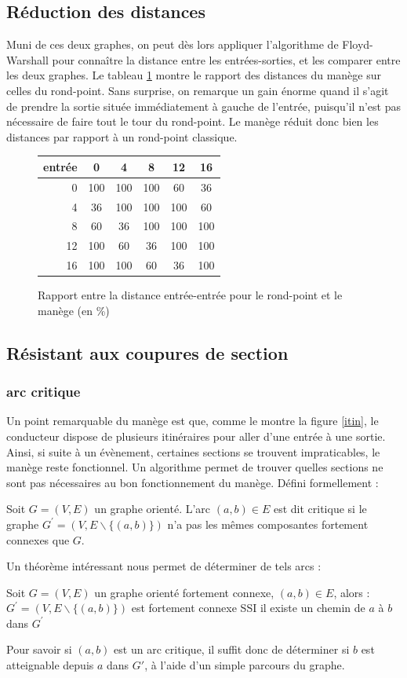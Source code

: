 \documentclass[11pt]{article}
\begin{document}
	\subsection{Réduction des distances}
Muni de ces deux graphes, on peut dès lors appliquer l'algorithme de Floyd-Warshall pour connaître la distance entre les entrées-sorties, et les comparer entre les deux graphes. Le tableau \ref{rpfw} montre le rapport des distances du manège sur celles du rond-point. Sans surprise, on remarque un gain énorme quand il s'agit de prendre la sortie située immédiatement à gauche de l'entrée, puisqu'il n'est pas nécessaire de faire tout le tour du rond-point. Le manège réduit donc bien les distances par rapport à un rond-point classique.

\begin{figure}
	\caption{\label{rpfw} Rapport entre la distance entrée-entrée pour le rond-point et le manège (en \%)}
	\begin{center}
	\begin{tabular}{ r|c c c c c}
  entrée & 0 & 4 & 8 & 12 & 16 \\ \hline
  0 & 100 & 100 & 100 & 60 & 36 \\
4 & 36 & 100 & 100 & 100 & 60 \\
8 & 60 & 36 & 100 & 100 & 100 \\
12 & 100 & 60 & 36 & 100 & 100 \\
16 & 100 & 100 & 60 & 36 & 100 \\
	\end{tabular}
	\end{center}
\end{figure}
	\subsection{Résistant aux coupures de section}
		\subsubsection{arc critique}
	Un point remarquable du manège est que, comme le montre la figure \ref{itin}, le conducteur dispose de plusieurs itinéraires pour aller d'une entrée à une sortie. Ainsi, si suite à un évènement, certaines sections se trouvent impraticables, le manège reste fonctionnel. Un algorithme permet de trouver quelles sections ne sont pas nécessaires au bon fonctionnement du manège. Défini formellement :
\begin{defin}
	Soit $G = (V,E)$ un graphe orienté. L'arc $(a,b) \in E$ est dit critique si le graphe $G^\prime = (V,E\backslash \{(a,b)\})$ n'a pas les mêmes composantes fortement connexes que $G$.
\end{defin}
Un théorème intéressant nous permet de déterminer de tels arcs : 
\begin{theo}
		Soit $G=(V,E)$ un graphe orienté fortement connexe, $(a,b) \in E$, alors :
		$G^\prime = (V,E\backslash \{ (a,b) \})$ est fortement connexe SSI il existe un chemin de $a$ à $b$
		dans $G^\prime$
\end{theo}
Pour savoir si $(a,b)$ est un arc critique, il suffit donc de déterminer si $b$ est atteignable depuis $a$ dans $G\prime$, à l'aide d'un simple parcours du graphe.
\end{document}
